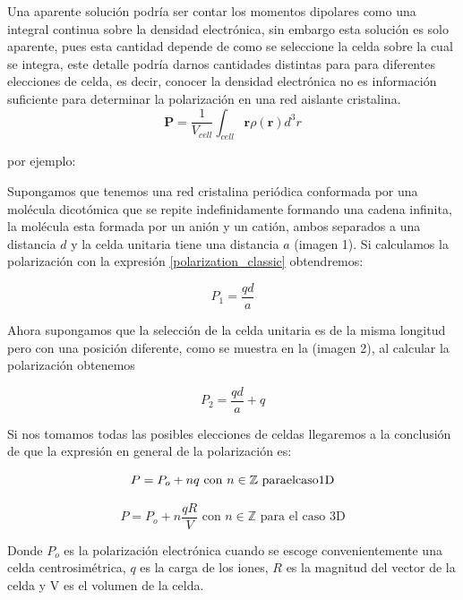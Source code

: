 Una aparente solución podría ser contar los momentos dipolares como una integral continua sobre la densidad electrónica, sin embargo esta solución es solo aparente, pues esta cantidad depende de como se seleccione la celda sobre la cual se integra, este detalle podría darnos cantidades distintas para para diferentes elecciones de celda, es decir, conocer la densidad electrónica no es información suficiente para determinar la polarización en una red aislante cristalina.
\begin{equation}
\label{polarization_classic}
\textbf{P} = \frac{1}{V_{cell}}\int_{cell} \textbf{r} \rho(\textbf{r})d^3r
\end{equation}

por ejemplo:

Supongamos que tenemos una red cristalina periódica conformada por una molécula dicotómica que se repite indefinidamente formando una cadena infinita, la molécula esta formada por un anión y un catión, ambos separados a una distancia $d$ y la celda unitaria tiene una distancia $a$ (imagen 1). Si calculamos la polarización con la expresión \ref{polarization_classic} obtendremos:

\begin{equation}
    P_1 = \frac{qd}{a}
\end{equation}

Ahora supongamos que la selección de la celda unitaria es de la misma longitud pero con una posición diferente, como se muestra en la (imagen 2), al calcular la polarización obtenemos 

\begin{equation}
    P_2 = \frac{qd}{a} + q
\end{equation}

Si nos tomamos todas las posibles elecciones de celdas llegaremos a la conclusión de que la expresión en general de la polarización es:

\begin{equation}
    P = P_o + nq\,\,  {\rm con} \,\,n \in \mathbb{Z}\,\, {\rm para el caso 1D} 
\end{equation}

\begin{equation}
    P = P_o + n\frac{qR}{V}\,\,  \text{con} \,\,n \in \mathbb{Z}\,\, \text{para el caso 3D}
\end{equation}

Donde $P_o$ es la polarización electrónica cuando se escoge convenientemente una celda centrosimétrica, $q$ es la carga de los iones, $R$ es la magnitud del vector de la celda y V es el volumen de la celda.

